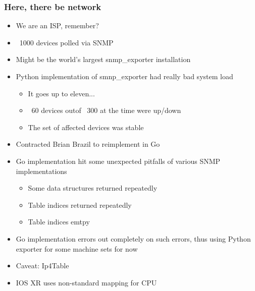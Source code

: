 \documentclass[t]{beamer}
\begin{document}
\begin{frame}
	\frametitle{Here, there be network}
	\begin{itemize}
		\item We are an ISP, remember?
		\item ~1000 devices polled via SNMP
		\item Might be the world's largest snmp\_exporter installation
		\item Python implementation of smnp\_exporter had really bad system load
		\begin{itemize}
			\item It goes up to eleven...
			\item ~60 devices outof ~300 at the time were up/down
			\item The set of affected devices was stable
		\end{itemize}
		\item Contracted Brian Brazil to reimplement in Go
		\item Go implementation hit some unexpected pitfalls of various SNMP implementations
		\begin{itemize}
			\item Some data structures returned repeatedly
			\item Table indices returned repeatedly
			\item Table indices emtpy
		\end{itemize}
		\item Go implementation errors out completely on such errors, thus using Python exporter for some machine sets for now
		\item Caveat: Ip4Table %
		\item IOS XR uses non-standard mapping for CPU %
	\end{itemize}
\end{frame}




\end{document}
